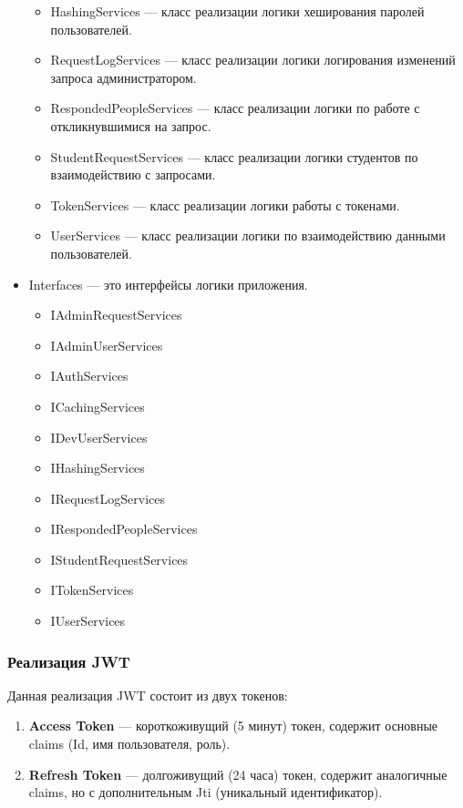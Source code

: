 \begin{itemize}
{\begin{itemize}
				\item{HashingServices --- класс реализации логики хеширования паролей пользователей.}
				\item{RequestLogServices --- класс реализации логики логирования изменений запроса администратором.}
				\item{RespondedPeopleServices --- класс реализации логики по работе с откликнувшимися на запрос.}
				\item{StudentRequestServices --- класс реализации логики студентов по взаимодействию с запросами.}
				\item{TokenServices --- класс реализации логики работы с токенами.}
				\item{UserServices --- класс реализации логики по взаимодействию данными пользователей.}
			\end{itemize}
		}
	\item{Interfaces --- это интерфейсы логики приложения.
			\begin{itemize}
				\item{IAdminRequestServices}
				\item{IAdminUserServices}
				\item{IAuthServices}
				\item{ICachingServices}
				\item{IDevUserServices}
				\item{IHashingServices}
				\item{IRequestLogServices}
				\item{IRespondedPeopleServices}
				\item{IStudentRequestServices}
				\item{ITokenServices}
				\item{IUserServices}
			\end{itemize}
		}
\end{itemize}

\subsubsection{Реализация JWT}
Данная реализация JWT состоит из двух токенов:
\begin{enumerate}
	\item{\textbf{Access Token} --- короткоживущий (5 минут) токен, содержит основные claims (Id, имя пользователя, роль).}
	\item{\textbf{Refresh Token} --- долгоживущий (24 часа) токен, содержит аналогичные claims, но с дополнительным Jti (уникальный идентификатор).}
\end{enumerate}


